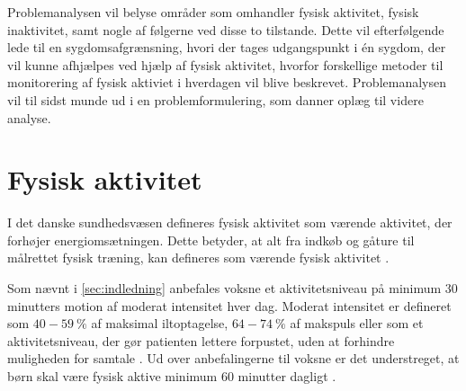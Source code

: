Problemanalysen vil belyse områder som omhandler fysisk aktivitet, fysisk inaktivitet, samt nogle af følgerne ved disse to tilstande. Dette vil efterfølgende lede til en sygdomsafgrænsning, hvori der tages udgangspunkt i én sygdom, der vil kunne afhjælpes ved hjælp af fysisk aktivitet, hvorfor forskellige metoder til monitorering af fysisk aktiviet i hverdagen vil blive beskrevet. Problemanalysen vil til sidst munde ud i en problemformulering, som danner oplæg til videre analyse.

\section{Fysisk aktivitet}\label{sec:prob_fysaktiv}

I det danske sundhedsvæsen defineres fysisk aktivitet som værende aktivitet, der forhøjer energiomsætningen. Dette betyder, at alt fra indkøb og gåture til målrettet fysisk træning, kan defineres som værende fysisk aktivitet \citep{motionsraad2007, terkelsen2015}.

Som nævnt i \autoref{sec:indledning} anbefales voksne et aktivitetsniveau på minimum 30 minutters motion af moderat intensitet hver dag. Moderat intensitet er defineret som $40-59~\%$ af maksimal iltoptagelse, $64-74~\%$ af makspuls eller som et aktivitetsniveau, der gør patienten lettere forpustet, uden at forhindre muligheden for samtale \citep{motionsraad2007}.
Ud over anbefalingerne til voksne er det understreget, at børn skal være fysisk aktive minimum 60 minutter dagligt \citep{pedersen2011}. 
